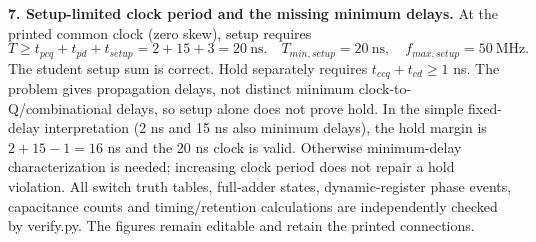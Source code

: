 \documentclass[10pt]{article}
\begin{document}
\textbf{7. Setup-limited clock period and the missing minimum delays.}
At the printed common clock (zero skew), setup requires
\[T\geq t_{pcq}+t_{pd}+t_{setup}=2+15+3=20\ \mathrm{ns}.
\quad\boxed{T_{min,setup}=20\ \mathrm{ns},\quad f_{max,setup}=50\ \mathrm{MHz}.}\]
The student setup sum is correct. Hold separately requires $t_{ccq}+t_{cd}\geq1$ ns. The problem gives propagation delays, not distinct minimum clock-to-Q/combinational delays, so setup alone does not prove hold. In the simple fixed-delay interpretation (2 ns and 15 ns also minimum delays), the hold margin is $2+15-1=16$ ns and the 20 ns clock is valid. Otherwise minimum-delay characterization is needed; increasing clock period does not repair a hold violation.
\small All switch truth tables, full-adder states, dynamic-register phase events, capacitance counts and timing/retention calculations are independently checked by verify.py. The figures remain editable and retain the printed connections.
\end{document}
